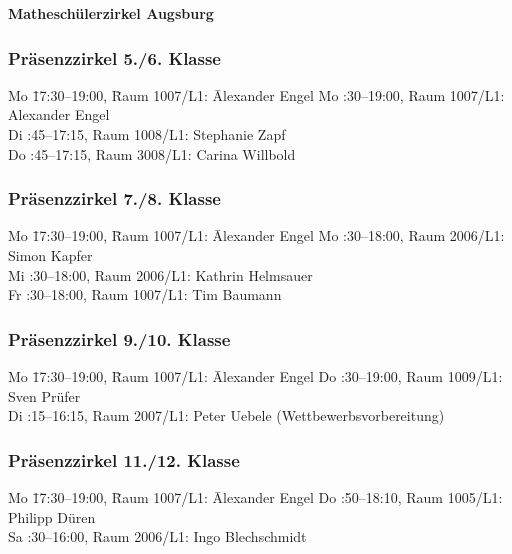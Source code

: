 \documentclass[a4paper,ngerman,14pt]{scrartcl}
\begin{document}
\onehalfspacing

\begin{raggedright}
\Large\textbf{Matheschülerzirkel Augsburg}
\end{raggedright}
\vspace{0.2em}

\subsubsection*{Präsenzzirkel 5./6. Klasse}
\begin{tabbing}
  Mo \= 17:30–19:00, \= Raum 1007/L1: \= Alexander Engel \kill
  Mo :30–19:00, \> Raum 1007/L1: \> Alexander Engel \\
  Di :45–17:15, \> Raum 1008/L1: \> Stephanie Zapf \\
  Do :45–17:15, \> Raum 3008/L1: \> Carina Willbold
\end{tabbing}

\subsubsection*{Präsenzzirkel 7./8. Klasse}

\begin{tabbing}
  Mo \= 17:30–19:00, \= Raum 1007/L1: \= Alexander Engel \kill
  Mo :30–18:00, \> Raum 2006/L1: \> Simon Kapfer \\
  Mi :30–18:00, \> Raum 2006/L1: \> Kathrin Helmsauer \\
  Fr :30–18:00, \> Raum 1007/L1: \> Tim Baumann
\end{tabbing}

\subsubsection*{Präsenzzirkel 9./10. Klasse}

\begin{tabbing}
  Mo \= 17:30–19:00, \= Raum 1007/L1: \= Alexander Engel \kill
  Do :30–19:00, \> Raum 1009/L1: \> Sven Prüfer \\
  Di :15–16:15, \> Raum 2007/L1: \> Peter Uebele (Wettbewerbsvorbereitung)
\end{tabbing}

\subsubsection*{Präsenzzirkel 11./12. Klasse}

\begin{tabbing}
  Mo \= 17:30–19:00, \= Raum 1007/L1: \= Alexander Engel \kill
  Do :50–18:10, \> Raum 1005/L1: \> Philipp Düren \\
  Sa :30–16:00, \> Raum 2006/L1: \> Ingo Blechschmidt
\end{tabbing}
\end{document}
